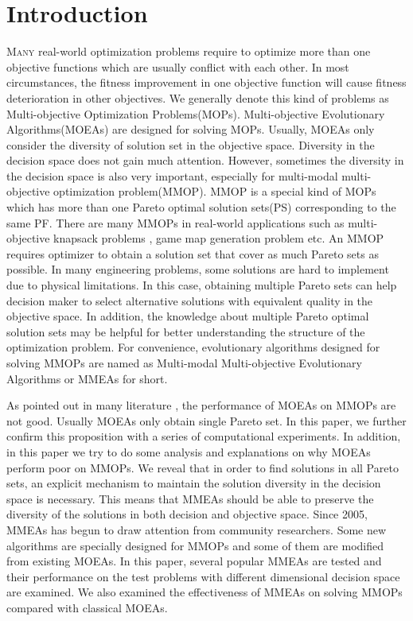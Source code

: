 \documentclass[conference]{IEEEtran}
\begin{document}
\section{Introduction}
\lettrine[lines=2]{M}{any} real-world optimization problems require to optimize more than one objective functions which are usually conflict with each other. In most circumstances, the fitness improvement in one objective function will cause fitness deterioration in other objectives. We generally denote this kind of problems as Multi-objective Optimization Problems(MOPs). Multi-objective Evolutionary Algorithms(MOEAs) are designed for solving MOPs. Usually, MOEAs only consider the diversity of solution set in the objective space. Diversity in the decision space does not gain much attention. However, sometimes the diversity in the decision space is also very important, especially for multi-modal multi-objective optimization problem(MMOP). MMOP is a special kind of MOPs which has more than one Pareto optimal solution sets(PS) corresponding to the same PF. There are many MMOPs in real-world applications such as multi-objective knapsack problems \cite{Jaszkiewicz2002}, game map generation problem \cite{Togelius} etc. An MMOP requires optimizer to obtain a solution set that cover as much Pareto sets as possible. In many engineering problems, some solutions are hard to implement due to physical limitations. In this case, obtaining multiple Pareto sets can help decision maker to select alternative solutions with equivalent quality in the objective space. In addition, the knowledge about multiple Pareto optimal solution sets may be helpful for better understanding the structure of the optimization problem\cite{Deb2001}. For convenience, evolutionary algorithms designed for solving MMOPs are named as Multi-modal Multi-objective Evolutionary Algorithms or MMEAs for short.

As pointed out in many literature\cite{Tanabe2019} \cite{Liang2016}, the performance of MOEAs on MMOPs are not good. Usually MOEAs only obtain single Pareto set. In this paper, we further confirm this proposition with a series of computational experiments. In addition, in this paper we try to do some analysis and explanations on why MOEAs perform poor on MMOPs. We reveal that in order to find solutions in all Pareto sets, an explicit mechanism to maintain the solution diversity in the decision space is necessary. This means that MMEAs should be able to preserve the diversity of the solutions in both decision and objective space.  Since 2005, MMEAs has begun to draw attention from community researchers. Some new algorithms are specially designed for MMOPs and some of them are modified from existing MOEAs. In this paper, several popular MMEAs are tested and their performance on the test problems with different dimensional decision space are examined. We also examined the effectiveness of MMEAs on solving MMOPs compared with classical MOEAs.
\end{document}
